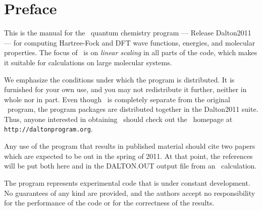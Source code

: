\tableofcontents

\chapter*{Preface}

This is the manual for the \lsdalton\ quantum chemistry program
--- Release Dalton2011 --- for computing Hartree-Fock and DFT 
wave functions, energies, and molecular properties.
The focus of \lsdalton\ is on {\em linear scaling} in all parts 
of the code, which makes it suitable for calculations on large
molecular systems.

We emphasize the conditions under which the
program is distributed.  It is furnished for your own use,
and you may not redistribute it further, neither in whole nor in
part.  Even though \lsdalton\ is completely separate from the original
\dalton\ program, the program packages are distributed together in the
Dalton2011 suite. Thus, 
anyone interested in obtaining \lsdalton\ should check out the
\dalton\ homepage at
\verb|http://daltonprogram.org|.

Any use of the program that results in published
material should cite two papers which are expected to be out in the spring
of 2011. At that point, the references will be put both here and in the DALTON.OUT
output file from an \lsdalton\ calculation.

The program represents experimental code that is
under constant development.  No guarantees of any kind are
provided, and the authors accept no responsibility for the
performance of the code or for the correctness of the results.
